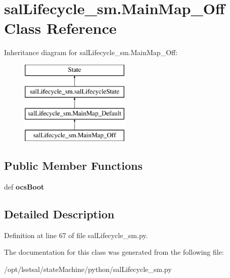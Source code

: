 \hypertarget{classsal_lifecycle__sm_1_1_main_map___off}{\section{sal\-Lifecycle\-\_\-sm.\-Main\-Map\-\_\-\-Off Class Reference}
\label{classsal_lifecycle__sm_1_1_main_map___off}
}
Inheritance diagram for sal\-Lifecycle\-\_\-sm.\-Main\-Map\-\_\-\-Off\-:\begin{figure}[H]
\begin{center}
\leavevmode
\includegraphics[height=4.000000cm]{classsal_lifecycle__sm_1_1_main_map___off}
\end{center}
\end{figure}
\subsection*{Public Member Functions}
\begin{DoxyCompactItemize}
\item 
\hypertarget{classsal_lifecycle__sm_1_1_main_map___off_aec35ac388d0f057979885f845f15d732}{def {\bfseries ocs\-Boot}}\label{classsal_lifecycle__sm_1_1_main_map___off_aec35ac388d0f057979885f845f15d732}

\end{DoxyCompactItemize}


\subsection{Detailed Description}


Definition at line 67 of file sal\-Lifecycle\-\_\-sm.\-py.



The documentation for this class was generated from the following file\-:\begin{DoxyCompactItemize}
\item 
/opt/lsstsal/state\-Machine/python/sal\-Lifecycle\-\_\-sm.\-py\end{DoxyCompactItemize}
